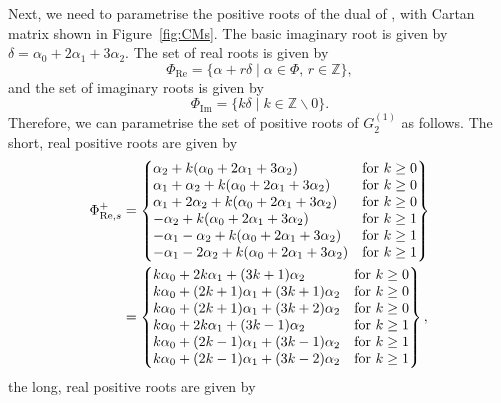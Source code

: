 \documentclass[pdftex]{sigma}
\numberwithin{equation}{section}
\theoremstyle{definition}
\newcommand{\Z}{\mathbb{Z}}
\begin{document}
Next, we need to parametrise the positive roots of the dual  of , with Cartan matrix shown in Figure~\ref{fig:CMs}. The basic imaginary root is given by $\delta = \alpha_0 + 2\alpha_1 + 3\alpha_2$. The set of real roots is given by
\[
\Phi_{\mathrm{Re}} = \{\alpha + r\delta \mid \alpha\in\Phi,\, r\in \Z\},
\]
and the set of imaginary roots is given by
\[
\Phi_{\mathrm{Im}} = \{k\delta \mid k\in \Z \backslash 0\}.
\]
Therefore, we can parametrise the set of positive roots of $G_2^{(1)}$ as follows. The short, real positive roots are given by
\begin{align*}
\Phi_{\mathrm{Re},s}^{+} &=
\left\{
\begin{array}{@{}ll@{}}
 \alpha_2 + k(\alpha_0 + 2\alpha_1 + 3\alpha_2) & \text{for} \ k \geq 0 \\
 \alpha_1 + \alpha_2 + k(\alpha_0 + 2\alpha_1 + 3\alpha_2) & \text{for} \  k \geq 0 \\
 \alpha_1 + 2\alpha_2 + k(\alpha_0 + 2\alpha_1 + 3\alpha_2) & \text{for} \  k \geq 0 \\
 -\alpha_2 + k(\alpha_0 + 2\alpha_1 + 3\alpha_2) & \text{for} \  k \geq 1 \\
 -\alpha_1 - \alpha_2 + k(\alpha_0 + 2\alpha_1 + 3\alpha_2) & \text{for} \  k \geq 1 \\
 -\alpha_1 - 2\alpha_2 + k(\alpha_0 + 2\alpha_1 + 3\alpha_2) & \text{for} \  k \geq 1
\end{array}
\right\} \\
&=
\left\{
\begin{array}{@{}ll@{}}
 k\alpha_0 + 2k\alpha_1 + (3k+1)\alpha_2 & \text{for} \  k \geq 0 \\
 k\alpha_0 + (2k+1)\alpha_1 + (3k+1)\alpha_2 & \text{for} \  k \geq 0 \\
 k\alpha_0 + (2k+1)\alpha_1 + (3k+2)\alpha_2 & \text{for} \  k \geq 0 \\
 k\alpha_0 + 2k\alpha_1 + (3k-1)\alpha_2 & \text{for} \  k \geq 1 \\
 k\alpha_0 + (2k-1)\alpha_1 + (3k-1)\alpha_2 & \text{for} \  k \geq 1 \\
 k\alpha_0 + (2k-1)\alpha_1 + (3k-2)\alpha_2 & \text{for} \  k \geq 1
\end{array}
\right\},
\end{align*}
the long, real positive roots are given by
\end{document}
